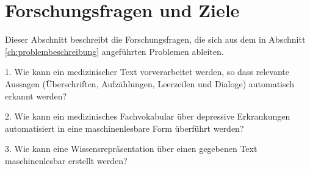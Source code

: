 \chapter{Forschungsfragen und Ziele}

Dieser Abschnitt beschreibt die Forschungsfragen, die sich aus dem in Abschnitt \ref{ch:problembeschreibung} angeführten Problemen ableiten.

1.	Wie kann ein medizinischer Text vorverarbeitet werden, so dass relevante Aussagen (Überschriften, Aufzählungen, Leerzeilen und Dialoge) automatisch erkannt werden?


2.	Wie kann ein medizinisches Fachvokabular über depressive Erkrankungen automatisiert in eine maschinenlesbare Form überführt werden?


3.	Wie kann eine Wissensrepräsentation über einen gegebenen Text maschinenlesbar erstellt werden?


